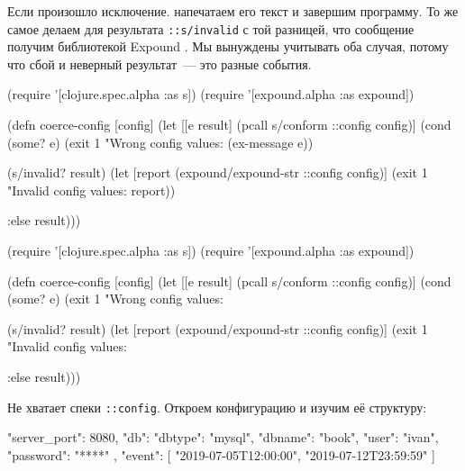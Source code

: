 Если произошло исключение. напечатаем его текст и завершим программу. То же
самое делаем для результата \verb|::s/invalid| с той разницей, что сообщение
получим библиотекой Expound . Мы вынуждены учитывать оба случая,
потому что сбой и неверный результат~--- это разные события.

\ifx\DEVICETYPE\MOBILE

\begin{english}
  \begin{clojure}
(require '[clojure.spec.alpha :as s])
(require '[expound.alpha :as expound])

(defn coerce-config [config]
  (let [[e result] (pcall s/conform
                     ::config config)]
    (cond
      (some? e)
      (exit 1 "Wrong config values: %
        (ex-message e))

      (s/invalid? result)
      (let [report (expound/expound-str
                     ::config config)]
        (exit 1
          "Invalid config values: %
          \newline report))

      :else result)))
  \end{clojure}
\end{english}

\else

\begin{english}
  \begin{clojure}
(require '[clojure.spec.alpha :as s])
(require '[expound.alpha :as expound])

(defn coerce-config [config]
  (let [[e result] (pcall s/conform ::config config)]
    (cond
      (some? e)
      (exit 1 "Wrong config values: %

      (s/invalid? result)
      (let [report (expound/expound-str ::config config)]
        (exit 1 "Invalid config values: %

      :else result)))
  \end{clojure}
\end{english}

\fi

Не хватает спеки \verb|::config|. Откроем конфигурацию и изучим её структуру:


\begin{english}
  \begin{json}
{
    "server_port": 8080,
    "db": {
        "dbtype":   "mysql",
        "dbname":   "book",
        "user":     "ivan",
        "password": "****"
    },
    "event": [
        "2019-07-05T12:00:00",
        "2019-07-12T23:59:59"
    ]
}
  \end{json}
\end{english}

